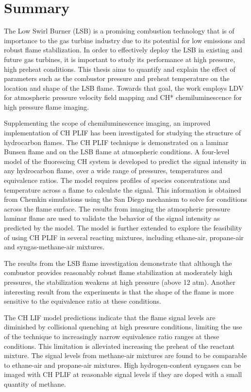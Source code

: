 \chapter*{Summary}

The Low Swirl Burner (LSB) is a promising combustion technology that is of importance to the gas turbine industry due to its potential for low  emissions and robust flame stabilization.
In order to effectively deploy the LSB in existing and future gas turbines, it is important to study its performance at high pressure, high preheat conditions.
This thesis aims to quantify and explain the effect of parameters such as the combustor pressure and preheat temperature on the location and shape of the LSB flame.
Towards that goal, the work employs LDV for atmospheric pressure velocity field mapping and CH* chemiluminescence for high pressure flame imaging.

Supplementing the scope of chemiluminescence imaging, an improved implementation of CH PLIF has been investigated for studying the structure of hydrocarbon flames.
The CH PLIF technique is demonstrated on a laminar Bunsen flame and on the LSB flame at atmospheric conditions.
A four-level model of the fluorescing CH system is developed to predict the signal intensity in any hydrocarbon flame, over a wide range of pressures, temperatures and equivalence ratios.
The model requires profiles of species concentrations and temperature across a flame to calculate the signal.
This information is obtained from Chemkin simulations using the San Diego mechanism to solve for conditions across the flame surface.
The results from imaging the atmospheric pressure laminar flame are used to validate the behavior of the signal intensity as predicted by the model.
The model is further extended to explore the feasibility of using CH PLIF in several reacting mixtures, including ethane-air, propane-air and syngas-methane-air mixtures.

The results from the LSB flame investigation demonstrate that although the combustor provides reasonably robust flame stabilization at moderately high pressures, the stabilization weakens at high pressure (above 12 atm).
Another interesting result from the experiments is that the shape of the flame is more sensitive to the equivalence ratio at these conditions.

The CH LIF model predictions indicate that the flame signal levels are diminished by collisional quenching at high pressure conditions, limiting the use of the technique to increasingly narrow equivalence ratio ranges at these conditions.
This limitation is alleviated increasing the preheat of the reactant mixture.
The signal levels from methane-air mixtures are found to be comparable to ethane-air and propane-air mixtures.
High hydrogen-content syngases can be imaged with CH PLIF at reasonable signal levels if they are doped with a small quantity of methane.


